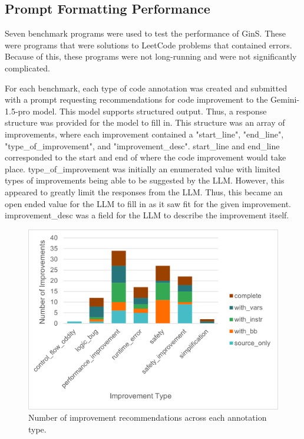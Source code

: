 \documentclass[sigconf,nonacm]{acmart}
\begin{document}
\subsection{Prompt Formatting Performance}

Seven benchmark programs were used to test the performance of GinS.
These were programs that were solutions to LeetCode problems that contained errors.
Because of this, these programs were not long-running and were not significantly complicated.

For each benchmark, each type of code annotation was created and submitted with a prompt requesting recommendations for code improvement to the Gemini-1.5-pro model.
This model supports structured output.
Thus, a response structure was provided for the model to fill in.
This structure was an array of improvements, where each improvement contained a "start\_line", "end\_line", "type\_of\_improvement", and "improvement\_desc".
start\_line and end\_line corresponded to the start and end of where the code improvement would take place.
type\_of\_improvement was initially an enumerated value with limited types of improvements being able to be suggested by the LLM.
However, this appeared to greatly limit the responses from the LLM.
Thus, this became an open ended value for the LLM to fill in as it saw fit for the given improvement.
improvement\_desc was a field for the LLM to describe the improvement itself.

\begin{figure}
    \centering
    \includegraphics[width=0.8\linewidth]{images/PostFiltering.png}
    \caption{Number of improvement recommendations across each annotation type.}
    \label{fig:filtered}
\end{figure}
\end{document}
